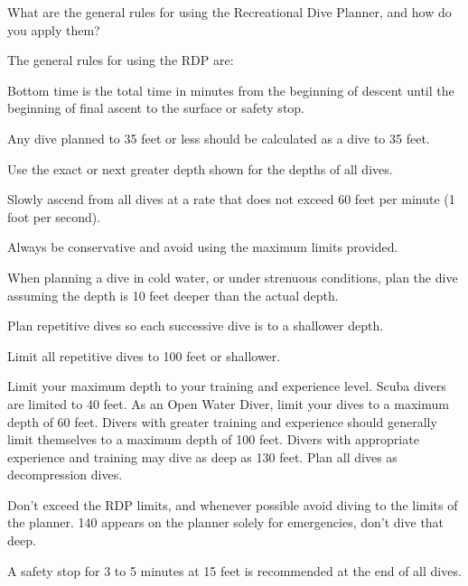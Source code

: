 	\begin{qanda}
		\begin{question}
What are the general rules for using the Recreational Dive Planner, and how do you apply them?
		\end{question}

		\begin{answer}
The general rules for using the RDP are:
			\begin{nospacenumberedlist}
				\item Bottom time is the total time in minutes from the beginning of descent until the beginning of final ascent to the surface or safety stop.
				\item Any dive planned to 35 feet or less should be calculated as a dive to 35 feet.
				\item Use the exact or next greater depth shown for the depths of all dives.
				\item Slowly ascend from all dives at a rate that does not exceed 60 feet per minute (1 foot per second).
				\item Always be conservative and avoid using the maximum limits provided.
				\item When planning a dive in cold water, or under strenuous conditions, plan the dive assuming the depth is 10 feet deeper than the actual depth.
				\item Plan repetitive dives so each successive dive is to a shallower depth.
				\item Limit all repetitive dives to 100 feet or shallower.
				\item Limit your maximum depth to your training and experience level.  Scuba divers are limited to 40 feet.  As an Open Water Diver, limit your dives to a maximum depth of 60 feet.  Divers with greater training and experience should generally limit themselves to a maximum depth of 100 feet.  Divers with appropriate experience and training may dive as deep as 130 feet.  Plan all dives as decompression dives.
				\item Don't exceed the RDP limits, and whenever possible avoid diving to the limits of the planner.  140 appears on the planner solely for emergencies, don't dive that deep.
				\item A safety stop for 3 to 5 minutes at 15 feet is recommended at the end of all dives.
			\end{nospacenumberedlist}
		\end{answer}
	\end{qanda}

